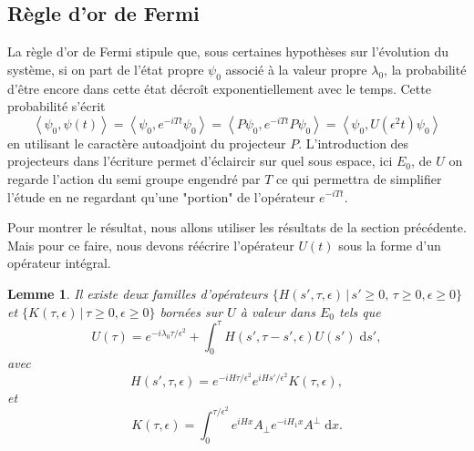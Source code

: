\documentclass[12pt,openany,a4paper, titlepage]{article}
\newcommand{\la}{\left\langle}
\newcommand{\ra}{\right\rangle}
\newcommand{\dd}{\;\mathrm{d}}
\newcommand{\St}[2]{e^{-i #1 #2}}
\newcommand{\Stt}[2]{e^{i #1 #2}}
\newtheorem{lem}{Lemme}
\theoremstyle{definition}
\theoremstyle{definition}
\theoremstyle{definition}
\theoremstyle{definition}
\theoremstyle{definition}
\theoremstyle{definition}
\begin{document}
\subsection{Règle d'or de Fermi}

La règle d'or de Fermi stipule que, sous certaines hypothèses sur l'évolution du système, si on part de l'état propre $\psi_0$ associé à la valeur propre $\lambda_0$, la probabilité d'être encore dans cette état décroît exponentiellement avec le temps. Cette probabilité s'écrit 
$$\la \psi_0,\psi(t) \ra = \la \psi_0, \St{T}{t} \psi_0 \ra = \la P\psi_0, \St{T}{t} P\psi_0 \ra = \la \psi_0, U(\epsilon^2t) \psi_0 \ra$$
en utilisant le caractère autoadjoint du projecteur $P$. L'introduction des projecteurs dans l'écriture permet d'éclaircir sur quel sous espace, ici $E_0$, de $U$ on regarde l'action du semi groupe engendré par $T$ ce qui permettra de simplifier l'étude en ne regardant qu'une "portion" de l'opérateur $\St{T}{t}$.


Pour montrer le résultat, nous allons utiliser les résultats de la section précédente. Mais pour ce faire, nous devons réécrire l'opérateur $U(t)$ sous la forme d'un opérateur intégral.

\begin{lem}
Il existe deux familles d'opérateurs $\{H(s',\tau, \epsilon) \, |\, s'\geq 0, \, \tau \geq 0, \epsilon \geq 0\}$ et $\{K(\tau, \epsilon) \, | \, \tau \geq 0, \epsilon \geq 0\}$ bornées sur $U$ à valeur dans $E_0$ tels que 
\begin{equation}
    U(\tau) = \St{\lambda_0}{\tau/\epsilon^2} + \int_0^{\tau} H(s',\tau - s', \epsilon) U(s') \dd s',
\end{equation}
avec
\begin{equation}
    H(s',\tau, \epsilon) = \St{H}{\tau/\epsilon^2}\Stt{H}{s'/\epsilon^2} K(\tau,\epsilon),
\end{equation}
et
\begin{equation}
    K(\tau, \epsilon) = \int_0^{\tau/\epsilon^2} \Stt{H}{x}A_\perp \St{H_1}{x}A^\perp \dd x.
\end{equation}
\end{lem}
\end{document}
